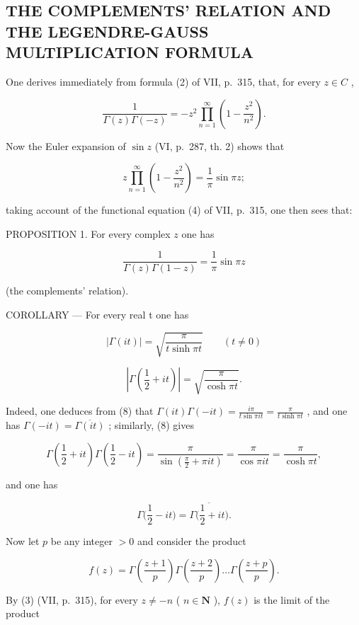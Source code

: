 \subsection{THE COMPLEMENTS' RELATION AND THE LEGENDRE-GAUSS MULTIPLICATION FORMULA}

One derives immediately from formula (2) of VII, p.~315, that, for every \(z \in C\) ,

\[
\frac {1}{\Gamma (z) \Gamma (- z)} = - z ^ {2} \prod_ {n = 1} ^ {\infty} \left(1 - \frac {z ^ {2}}{n ^ {2}}\right).
\]

Now the Euler expansion of \(\sin z\) (VI, p.~287, th. 2) shows that

\[
z \prod_ {n = 1} ^ {\infty} \left(1 - \frac {z ^ {2}}{n ^ {2}}\right) = \frac {1}{\pi} \sin \pi z;
\]

taking account of the functional equation (4) of VII, p.~315, one then sees that:

PROPOSITION 1. For every complex \(z\) one has

\[
\frac {1}{\Gamma (z) \Gamma (1 - z)} = \frac {1}{\pi} \sin \pi z\tag{8}
\]

(the complements' relation).

COROLLARY --- For every real t one has

\[
| \Gamma (i t) | = \sqrt {\frac {\pi}{t \sinh \pi t}} \qquad (t \neq 0)\tag{9}
\]

\[
\left| \Gamma (\frac {1}{2} + i t) \right| = \sqrt {\frac {\pi}{\cosh \pi t}}.\tag{10}
\]

Indeed, one deduces from (8) that \(\Gamma(it)\Gamma(-it) = \frac{i\pi}{t\sin\pi it} = \frac{\pi}{t\sinh\pi t}\) , and one has \(\Gamma(-it) = \overline{\Gamma(it)}\) ; similarly, (8) gives

\[
\Gamma \left(\frac {1}{2} + i t\right) \Gamma \left(\frac {1}{2} - i t\right) = \frac {\pi}{\sin \left(\frac {\pi}{2} + \pi i t\right)} = \frac {\pi}{\cos \pi i t} = \frac {\pi}{\cosh \pi t},
\]

and one has

\[
\Gamma \bigl (\frac {1}{2} - i t \bigr) = \overline {{\Gamma \bigl (\frac {1}{2} + i t \bigr)}}.
\]

Now let \(p\) be any integer \(> 0\) and consider the product

\[
f (z) = \Gamma \left(\frac {z + 1}{p}\right) \Gamma \left(\frac {z + 2}{p}\right) \dots \Gamma \left(\frac {z + p}{p}\right).
\]

By (3) (VII, p.~315), for every \(z \neq -n\) ( \(n \in \mathbf{N}\) ), \(f(z)\) is the limit of the product

